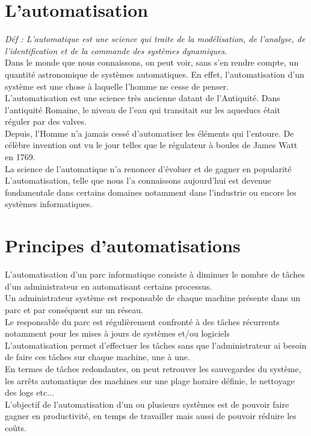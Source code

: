 \documentclass[12pt]{article}
\begin{document}
\section{L'automatisation}

\textit{Déf : L’automatique est une science qui traite de la modélisation, de l’analyse, de l’identification et de la commande des systèmes dynamiques.}
\vspace{0.5cm}
\\
Dans le monde que nous connaissons, on peut voir, sans s'en rendre compte, un quantité astronomique de systèmes automatiques. En effet, l'automatisation d'un système est une chose à laquelle l'homme ne cesse de penser. 
\\
L'automatisation est une science très ancienne datant de l'Antiquité. Dans l'antiquité Romaine, le  niveau de l'eau qui transitait sur les aqueducs était réguler par des valves.
\\
Depuis, l'Homme n'a jamais cessé d'automatiser les éléments qui l'entoure. De célèbre invention ont vu le jour telles que le régulateur à boules de James Watt en 1769.
\\
La science de l'automatique n'a renoncer d'évoluer et de gagner en popularité
\\
L'automatisation, telle que nous l'a connaissons aujourd'hui est devenue fondamentale dans certains domaines notamment dans l'industrie ou encore les systèmes informatiques.

\section{Principes d'automatisations}

L'automatisation d'un parc informatique consiste à diminuer le nombre de tâches d'un administrateur en automatisant certains processus.
\\
Un administrateur système est responsable de chaque machine présente dans un parc et par conséquent sur un réseau.
\\
Le responsable du parc est régulièrement confronté à des tâches récurrents notamment pour les mises à jours de systèmes et/ou logiciels
\\
L'automatisation permet d'effectuer les tâches sans que l'administrateur ai besoin de faire ces tâches sur chaque machine, une à une.
\\
En termes de tâches redondantes, on peut retrouver les sauvegardes du système, les arrêts automatique des machines sur une plage horaire définie, le nettoyage des logs etc...
\\
L'objectif de l'automatisation d'un ou plusieurs systèmes est de pouvoir faire gagner en productivité, en temps de travailler mais aussi de pouvoir réduire les coûts.
\end{document}
